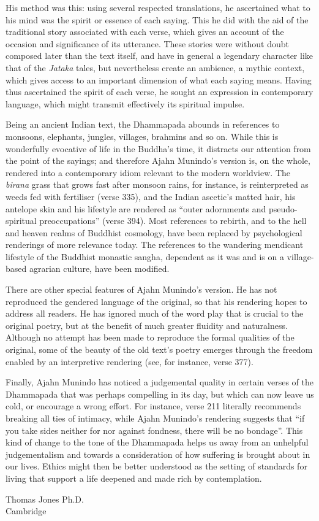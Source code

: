 His method was this: using several respected translations, he ascertained what to his mind was the spirit or essence of each saying. This he did with the aid of the traditional story associated with each verse, which gives an account of the occasion and significance of its utterance. These stories were without doubt composed later than the text itself, and have in general a legendary character like that of the \emph{Jataka} tales, but nevertheless create an ambience, a mythic context, which gives access to an important dimension of what each saying means. Having thus ascertained the spirit of each verse, he sought an expression in contemporary language, which might transmit effectively its spiritual impulse.

Being an ancient Indian text, the Dhammapada abounds in references to monsoons, elephants, jungles, villages, brahmins and so on. While this is wonderfully evocative of life in the Buddha’s time, it distracts our attention from the point of the sayings; and therefore Ajahn Munindo’s version is, on the whole, rendered into a contemporary idiom relevant to the modern worldview. The \emph{birana} grass that grows fast after monsoon rains, for instance, is reinterpreted as weeds fed with fertiliser (verse 335), and the Indian ascetic’s matted hair, his antelope skin and his lifestyle are rendered as “outer adornments and pseudo-spiritual preoccupations” (verse 394). Most references to rebirth, and to the hell and heaven realms of Buddhist cosmology, have been replaced by psychological renderings of more relevance today. The references to the wandering mendicant lifestyle of the Buddhist monastic sangha, dependent as it was and is on a village-based agrarian culture, have been modified.  

There are other special features of Ajahn Munindo’s version. He has not reproduced the gendered language of the original, so that his rendering hopes to address all readers. He has ignored much of the word play that is crucial to the original poetry, but at the benefit of much greater fluidity and naturalness. Although no attempt has been made to reproduce the formal qualities of the original, some of the beauty of the old text’s poetry emerges through the freedom enabled by an interpretive rendering (see, for instance, verse 377). 

Finally, Ajahn Munindo has noticed a judgemental quality in certain verses of the Dhammapada that was perhaps compelling in its day, but which can now leave us cold, or encourage a wrong effort. For instance, verse 211 literally recommends breaking all ties of intimacy, while Ajahn Munindo’s rendering suggests that “if you take sides neither for nor against fondness, there will be no bondage”. This kind of change to the tone of the Dhammapada helps us away from an unhelpful judgementalism and towards a consideration of how suffering is brought about in our lives. Ethics might then be better understood as the setting of standards for living that support a life deepened and made rich by contemplation.

Thomas Jones Ph.D.\\
Cambridge
